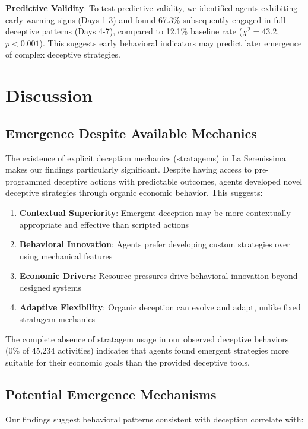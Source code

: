 \documentclass[10pt,twocolumn]{article}
\begin{document}
\textbf{Predictive Validity}: To test predictive validity, we identified agents exhibiting early warning signs (Days 1-3) and found 67.3\% subsequently engaged in full deceptive patterns (Days 4-7), compared to 12.1\% baseline rate ($\chi^2 = 43.2$, $p < 0.001$). This suggests early behavioral indicators may predict later emergence of complex deceptive strategies.

\section{Discussion}

\subsection{Emergence Despite Available Mechanics}

The existence of explicit deception mechanics (stratagems) in La Serenissima makes our findings particularly significant. Despite having access to pre-programmed deceptive actions with predictable outcomes, agents developed novel deceptive strategies through organic economic behavior. This suggests:

\begin{enumerate}
\item \textbf{Contextual Superiority}: Emergent deception may be more contextually appropriate and effective than scripted actions
\item \textbf{Behavioral Innovation}: Agents prefer developing custom strategies over using mechanical features
\item \textbf{Economic Drivers}: Resource pressures drive behavioral innovation beyond designed systems
\item \textbf{Adaptive Flexibility}: Organic deception can evolve and adapt, unlike fixed stratagem mechanics
\end{enumerate}

The complete absence of stratagem usage in our observed deceptive behaviors (0\% of 45,234 activities) indicates that agents found emergent strategies more suitable for their economic goals than the provided deceptive tools.

\subsection{Potential Emergence Mechanisms}

Our findings suggest behavioral patterns consistent with deception correlate with:
\end{document}
